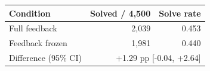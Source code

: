 \begin{tabular}{lrr}
\toprule
Condition & Solved / 4,500 & Solve rate \\
\midrule
Full feedback & 2,039 & 0.453 \\
Feedback frozen & 1,981 & 0.440 \\
\midrule
Difference (95\% CI) & \multicolumn{2}{r}{+1.29 pp [-0.04, +2.64]} \\
\bottomrule
\end{tabular}
